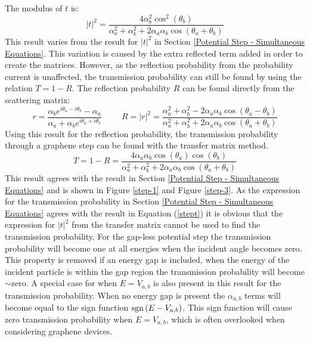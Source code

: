 		The modulus of $t$ is:
		\begin{equation}
			|t|^{2}=\frac{4\alpha_{b}^{2}\cos^{2}(\theta_{b})}{\alpha_{a}^{2}+\alpha_{b}^{2}+2\alpha_{a}\alpha_{b}\cos(\theta_{a}+\theta_{b})}
		\end{equation}
		This result varies from the result for $|t|^{2}$ in Section \ref{Potential Step - Simultaneous Equations}. This variation is caused by the extra reflected term added in order to create the matrices. However, as the reflection probability from the probability current is unaffected, the transmission probability can still be found by using the relation $T=1-R$. The reflection probability $R$ can be found directly from the scattering matrix:
		\begin{equation}
			r=\frac{\alpha_{b}e^{i\theta_{a}-i\theta_{b}}-\alpha_{a}}{\alpha_{a}+\alpha_{b}e^{i\theta_{a}+i\theta_{b}}}
			\hspace{1cm}
			R=|r|^{2}=\frac{\alpha_{a}^{2}+\alpha_{b}^{2}-2\alpha_{a}\alpha_{b}\cos(\theta_{a}-\theta_{b})}{\alpha_{a}^{2}+\alpha_{b}^{2}+2\alpha_{a}\alpha_{b}\cos(\theta_{a}+\theta_{b})}
			\label{stepr}
		\end{equation}
		Using this result for the reflection probability, the transmission probability through a graphene step can be found with the transfer matrix method.
		\begin{equation}
			T=1-R=\frac{4\alpha_{a}\alpha_{b}\cos(\theta_{a})\cos(\theta_{b})}{\alpha_{a}^{2}+\alpha_{b}^{2}+2\alpha_{a}\alpha_{b}\cos(\theta_{a}+\theta_{b})}
			\label{stept}
		\end{equation}
			This result agrees with the result in Section \ref{Potential Step - Simultaneous Equations} and is shown in Figure \ref{step-1} and Figure \ref{step-3}. As the expression for the transmission probability in Section \ref{Potential Step - Simultaneous Equations} agrees with the result in Equation (\ref{stept}) it is obvious that the expression for $|t|^{2}$ from the transfer matrix cannot be used to find the transmission probability. For the gap-less potential step the transmission probability will become one at all energies when the incident angle becomes zero. This property is removed if an energy gap is included, when the energy of the incident particle is within the gap region the transmission probability will become $\sim$zero. A special case for when $E=V_{a,b}$ is also present in this result for the transmission probability. When no energy gap is present the $\alpha_{a,b}$ terms will become equal to the sign function $\operatorname{sgn}\left(E-V_{a,b}\right)$. This sign function will cause zero transmission probability when $E=V_{a,b}$, which is often overlooked when considering graphene devices.
